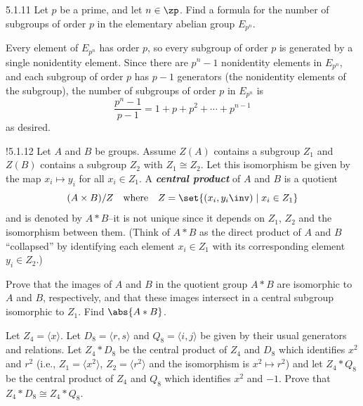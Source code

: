 \begin{exercise}{5.1.11}
    Let $p$ be a prime, and let $n \in \zp$.
	Find a formula for the number of subgroups of order $p$ in the elementary abelian group $E_{p^n}$.
\end{exercise}

\begin{sol}
    Every element of $E_{p^n}$ has order $p$, so every subgroup of order $p$ is generated by a single nonidentity element.
	Since there are $p^n - 1$ nonidentity elements in $E_{p^n}$, and each subgroup of order $p$ has $p - 1$ generators (the nonidentity elements of the subgroup), the number of subgroups of order $p$ in $E_{p^n}$ is
    \[
    	\frac{p^n - 1}{p - 1} = 1 + p + p^2 + \cdots + p^{n-1}
    \]
    as desired.
\end{sol}

\begin{exercise}!{5.1.12}
    Let $A$ and $B$ be groups.
	Assume $Z(A)$ contains a subgroup $Z_1$ and $Z(B)$ contains a subgroup $Z_2$ with $Z_1 \cong Z_2$.
	Let this isomorphism be given by the map $x_i \mapsto y_i$ for all $x_i \in Z_1$.
	A \textbf{\emph{central product}} of $A$ and $B$ is a quotient
    \[
    	(A \times B)/Z \quad \text{where} \quad Z = \set{(x_i, y_i\inv) \mid x_i \in Z_1}
    \]
    and is denoted by $A \ast B$--it is not unique since it depends on $Z_1$, $Z_2$ and the isomorphism between them. (Think of $A \ast B$ as the direct product of $A$ and $B$ ``collapsed'' by identifying each element $x_i \in Z_1$ with its corresponding element $y_i \in Z_2$.)
    \begin{subexercises}
        \item Prove that the images of $A$ and $B$ in the quotient group $A \ast B$ are isomorphic to $A$ and $B$, respectively, and that these images intersect in a central subgroup isomorphic to $Z_1$.
	    Find $\abs{A \ast B}$.
        \item Let $Z_4 = \langle x \rangle$.
	    Let $D_8 = \langle r, s \rangle$ and $Q_8 = \langle i, j \rangle$ be given by their usual generators and relations.
	    Let $Z_4 \ast D_8$ be the central product of $Z_4$ and $D_8$ which identifies $x^2$ and $r^2$ (i.e., $Z_1 = \langle x^2 \rangle$, $Z_2 = \langle r^2 \rangle$ and the isomorphism is $x^2 \mapsto r^2$) and let $Z_4 \ast Q_8$ be the central product of $Z_4$ and $Q_8$ which identifies $x^2$ and $-1$.
	    Prove that $Z_4 \ast D_8 \cong Z_4 \ast Q_8$.
    \end{subexercises}
\end{exercise}

